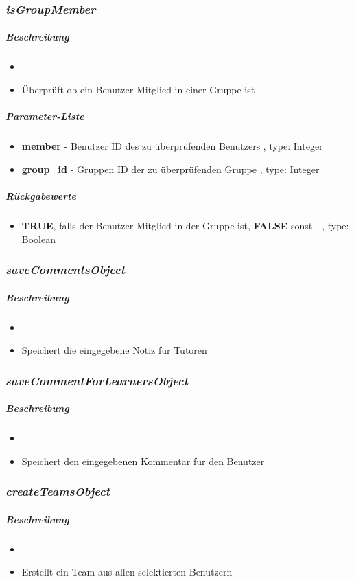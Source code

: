 \subsubsection*{\textit{isGroupMember}}\label{isGroupMemberTGUI}
\subparagraph{Beschreibung}
\begin{itemize}
	\item[] \noindent{}
	\item[]  Überprüft ob ein Benutzer Mitglied in einer Gruppe ist
\end{itemize}
\subparagraph{Parameter-Liste}
\begin{itemize}
	\item[] \textbf{member} - Benutzer ID des zu überprüfenden Benutzers , type: Integer 
	\item[] \textbf{group\_id} - Gruppen ID der zu überprüfenden Gruppe , type: Integer
\end{itemize}
\subparagraph{Rückgabewerte}
\begin{itemize}
	\item[] \textbf{TRUE}, falls der Benutzer Mitglied in der Gruppe ist, \textbf{FALSE} sonst - , type: Boolean
\end{itemize}

\subsubsection*{\textit{saveCommentsObject}}\label{saveCommentsObjectTGUI}
\subparagraph{Beschreibung}
\begin{itemize}
	\item[] \noindent{}
	\item[] Speichert die eingegebene Notiz für Tutoren
\end{itemize}


\subsubsection*{\textit{saveCommentForLearnersObject}}\label{saveCommentForLearnersObjectTGUI}
\subparagraph{Beschreibung}
\begin{itemize}
	\item[] \noindent{}
	\item[] Speichert den eingegebenen Kommentar für den Benutzer
\end{itemize}

\subsubsection*{\textit{createTeamsObject}}\label{createTeamsObjectTGUI}
\subparagraph{Beschreibung}
\begin{itemize}
	\item[] \noindent{}
	\item[] Erstellt ein Team aus allen selektierten Benutzern
\end{itemize}

